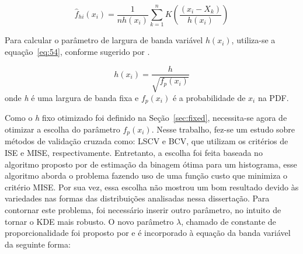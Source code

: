 \begin{equation}\label{eq:32}
  {\hat f_{hi}}\left( {{x_i}} \right) = \frac{1}{{nh({x_i})}}\sum\limits_{k = 1}^n K \left( {\frac{{({x_i} - {X_k})}}{{h({x_i})}}} \right)
\end{equation}


Para calcular o parâmetro de largura de banda variável $h({x_i})$, utiliza-se a equação~\ref{eq:54}, conforme sugerido por \cite{abramson1982bandwidth}.

\begin{equation}\label{eq:54}
  h\left( {{x_i}} \right) = \frac{h}{{\sqrt {{f_p}({x_i})} }}
\end{equation}
onde \emph{h} é uma largura de banda fixa e ${f_p}({x_i})$ é a probabilidade de ${x_i}$ na PDF.

%

%
%

Como o \emph{h} fixo otimizado foi definido na Seção~\ref{sec:fixed}, necessita-se agora de otimizar a escolha do parâmetro ${f_p}\left( {{x_i}} \right)$. Nesse trabalho, fez-se um estudo sobre métodos de validação cruzada como: \ac{LSCV} e \ac{BCV}, que utilizam os critérios de ISE e MISE, respectivamente. Entretanto, a escolha foi feita baseada no algoritmo proposto por \cite{shimazaki2007method} de estimação da binagem ótima para um histograma, esse algoritmo aborda o problema fazendo uso de uma função custo que minimiza o critério MISE. Por sua vez, essa escolha não mostrou um bom resultado devido às variedades nas formas das distribuições analisadas nessa dissertação. Para contornar este problema, foi necessário inserir outro parâmetro, no intuito de tornar o KDE mais robusto. O novo parâmetro ${\lambda}$, chamado de constante de proporcionalidade foi proposto por \cite{comaniciu2001variable} e é incorporado à equação da banda variável da seguinte forma:

